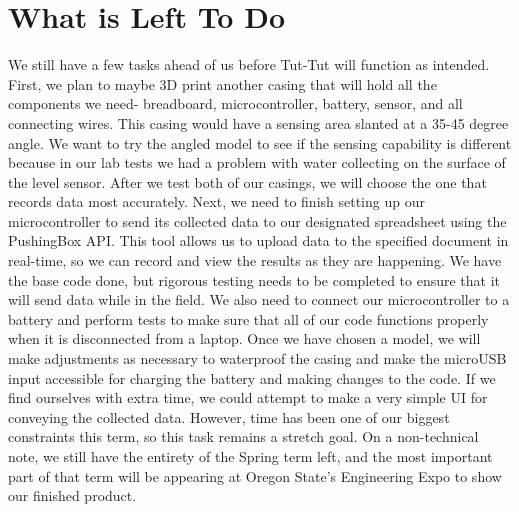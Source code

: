 \documentclass[letterpaper,10pt,draftclsnofoot,onecolumn]{article}
\begin{document}
\section{What is Left To Do}
We still have a few tasks ahead of us before Tut-Tut will function as intended. First, we plan to maybe 3D print another casing that will hold all the components we need- breadboard, microcontroller, battery, sensor, and all connecting wires. This casing would have a sensing area slanted at a 35-45 degree angle. We want to try the angled model to see if the sensing capability is different because in our lab tests we had a problem with water collecting on the surface of the level sensor. After we test both of our casings, we will choose the one that records data most accurately. Next, we need to finish setting up our microcontroller to send its collected data to our designated spreadsheet using the PushingBox API. This tool allows us to upload data to the specified document in real-time, so we can record and view the results as they are happening. We have the base code done, but rigorous testing needs to be completed to ensure that it will send data while in the field. We also need to connect our microcontroller to a battery and perform tests to make sure that all of our code functions properly when it is disconnected from a laptop. Once we have chosen a model, we will make adjustments as necessary to waterproof the casing and make the microUSB input accessible for charging the battery and making changes to the code. If we find ourselves with extra time, we could attempt to make a very simple UI for conveying the collected data. However, time has been one of our biggest constraints this term, so this task remains a stretch goal.
\newline
\newline
On a non-technical note, we still have the entirety of the Spring term left, and the most important part of that term will be appearing at Oregon State's Engineering Expo to show our finished product.
\end{document}
